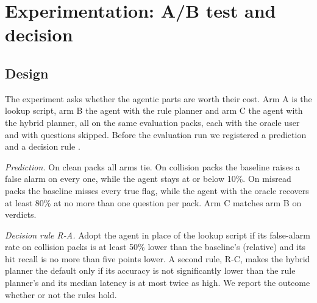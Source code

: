 \section{Experimentation: A/B test and decision}
\label{sec:experiment}

\subsection{Design}
The experiment asks whether the agentic parts are worth their cost. Arm A is the lookup script, arm B the agent with the rule planner and arm C the agent with the hybrid planner, all on the same evaluation packs, each with the oracle user and with questions skipped. Before the evaluation run we registered a prediction and a decision rule \cite{nosek2018preregistration}.

\emph{Prediction.} On clean packs all arms tie. On collision packs the baseline raises a false alarm on every one, while the agent stays at or below 10\%. On misread packs the baseline misses every true flag, while the agent with the oracle recovers at least 80\% at no more than one question per pack. Arm C matches arm B on verdicts.

\emph{Decision rule R-A.} Adopt the agent in place of the lookup script if its false-alarm rate on collision packs is at least 50\% lower than the baseline's (relative) and its hit recall is no more than five points lower. A second rule, R-C, makes the hybrid planner the default only if its accuracy is not significantly lower than the rule planner's and its median latency is at most twice as high. We report the outcome whether or not the rules hold.

